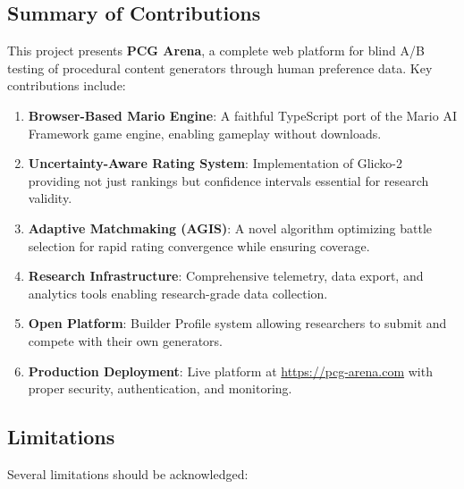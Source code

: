 \documentclass[11pt,a4paper]{article}
\theoremstyle{plain}
\theoremstyle{definition}
\theoremstyle{remark}
\begin{document}
\subsection{Summary of Contributions}
\label{subsec:contributions}

This project presents \textbf{PCG Arena}, a complete web platform for blind A/B testing of procedural content generators through human preference data. Key contributions include:

\begin{enumerate}
    \item \textbf{Browser-Based Mario Engine}: A faithful TypeScript port of the Mario AI Framework game engine, enabling gameplay without downloads.
    
    \item \textbf{Uncertainty-Aware Rating System}: Implementation of Glicko-2 providing not just rankings but confidence intervals essential for research validity.
    
    \item \textbf{Adaptive Matchmaking (AGIS)}: A novel algorithm optimizing battle selection for rapid rating convergence while ensuring coverage.
    
    \item \textbf{Research Infrastructure}: Comprehensive telemetry, data export, and analytics tools enabling research-grade data collection.
    
    \item \textbf{Open Platform}: Builder Profile system allowing researchers to submit and compete with their own generators.
    
    \item \textbf{Production Deployment}: Live platform at \url{https://pcg-arena.com} with proper security, authentication, and monitoring.
\end{enumerate}

\subsection{Limitations}
\label{subsec:limitations}

Several limitations should be acknowledged:
\end{document}
